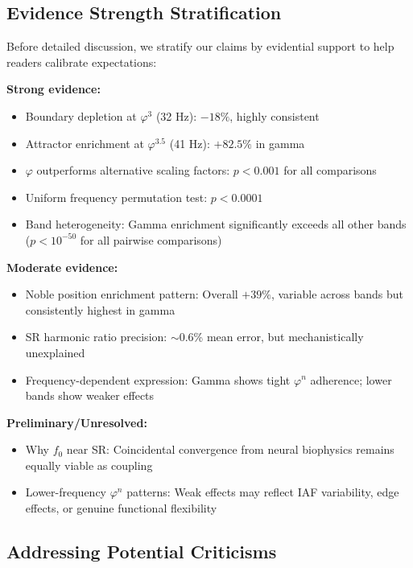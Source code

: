 \documentclass[11pt,a4paper]{article}
\newcommand{\phisym}{\varphi}
\newcommand{\fzero}{f_0}
\begin{document}
\subsection{Evidence Strength Stratification}

Before detailed discussion, we stratify our claims by evidential support to help readers calibrate expectations:

\textbf{Strong evidence:}
\begin{itemize}
    \item Boundary depletion at $\phisym^3$ (32 Hz): $-18\%$, highly consistent
    \item Attractor enrichment at $\phisym^{3.5}$ (41 Hz): $+82.5\%$ in gamma
    \item $\phisym$ outperforms alternative scaling factors: $p < 0.001$ for all comparisons
    \item Uniform frequency permutation test: $p < 0.0001$
    \item Band heterogeneity: Gamma enrichment significantly exceeds all other bands ($p < 10^{-50}$ for all pairwise comparisons)
\end{itemize}

\textbf{Moderate evidence:}
\begin{itemize}
    \item Noble position enrichment pattern: Overall $+39\%$, variable across bands but consistently highest in gamma
    \item SR harmonic ratio precision: $\sim$0.6\% mean error, but mechanistically unexplained
    \item Frequency-dependent expression: Gamma shows tight $\phisym^n$ adherence; lower bands show weaker effects
\end{itemize}

\textbf{Preliminary/Unresolved:}
\begin{itemize}
    \item Why $\fzero$ near SR: Coincidental convergence from neural biophysics remains equally viable as coupling
    \item Lower-frequency $\phisym^n$ patterns: Weak effects may reflect IAF variability, edge effects, or genuine functional flexibility
\end{itemize}

\subsection{Addressing Potential Criticisms}
\end{document}
